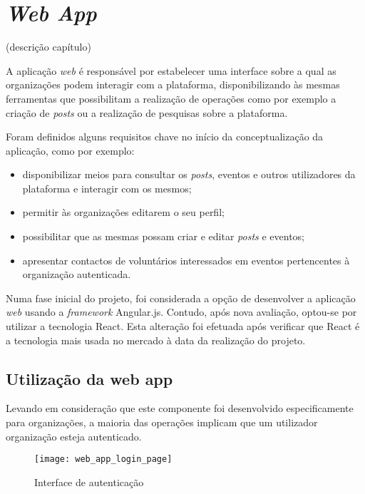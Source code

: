 \section{\textit{Web App}}

(descrição capítulo)

\par \medskip

A aplicação \textit{web} é responsável por estabelecer uma interface sobre a qual as organizações podem interagir com a plataforma, disponibilizando às mesmas ferramentas que possibilitam a realização de operações como por exemplo a criação de \textit{posts} ou a realização de pesquisas sobre a plataforma.

\par \medskip

Foram definidos alguns requisitos chave no início da conceptualização da aplicação, como por exemplo:

\begin{itemize}
	\item disponibilizar meios para consultar os \textit{posts}, eventos e outros utilizadores da plataforma e interagir com os mesmos; 
	\item permitir às organizações editarem o seu perfil;
	\item possibilitar que as mesmas possam criar e editar \textit{posts} e eventos;
	\item apresentar contactos de voluntários interessados em eventos pertencentes à organização autenticada.
\end{itemize}

Numa fase inicial do projeto, foi considerada a opção de desenvolver a aplicação \textit{web} usando a \textit{framework} Angular.js. Contudo, após nova avaliação, optou-se por utilizar a tecnologia React. Esta alteração foi efetuada após verificar que React é a tecnologia mais usada no mercado à data da realização do projeto. 

\subsection{Utilização da web app}

Levando em consideração que este componente foi desenvolvido especificamente para organizações, a maioria das operações implicam que um utilizador organização esteja autenticado.

\begin{figure}[h]
	\centering
	\texttt{[image: web\_app\_login\_page]}
	\caption{Interface de autenticação}
\end{figure}

